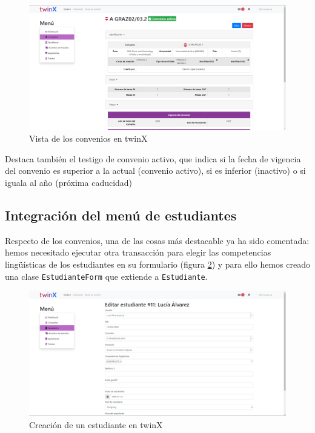 \begin{figure}
	\centering
	\includegraphics[width=\linewidth]{img/Capturas de twinX/vista_convenio}
	\caption{Vista de los convenios en twinX}
	\label{fig:vistaconveniotwinX}
\end{figure}


Destaca también el testigo de convenio activo, que indica si la fecha de vigencia del convenio es superior a la actual (convenio activo), si es inferior (inactivo) o si iguala al año (próxima caducidad)

\subsection{Integración del menú de estudiantes}

Respecto de los convenios, una de las cosas más destacable ya ha sido comentada: hemos necesitado ejecutar otra transacción para elegir las competencias lingüísticas de los estudiantes en su formulario (figura \ref{fig:formularioestudiantetwinX}) y para ello hemos creado una clase \texttt{EstudianteForm} que extiende a \texttt{Estudiante}.

\begin{figure}
	\centering
	\includegraphics[width=\linewidth]{img/Capturas de twinX/formulario_estudiante}
	\caption{Creación de un estudiante en twinX}
	\label{fig:formularioestudiantetwinX}
\end{figure}

